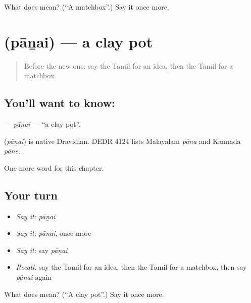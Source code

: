 \begin{tcolorbox}[breakable,colback=teal!4,colframe=teal!35!black,title={Before you move on}]
What does  mean? (\textquotedblleft{}A matchbox\textquotedblright{}.) Say it once more.
\end{tcolorbox}
\section[\texorpdfstring{\ta{பானை} (pāṉai)}{பானை (pāṉai)}]{ (pāṉai) — a clay pot}

\label{lesson:TA-C190-panai}



\begin{quote}
Before the new one: say the Tamil for an idea, then the Tamil for a matchbox.
\end{quote}

\subsection*{You'll want to know: }
\textbf{} — \emph{pāṉai} — \textquotedblleft{}a clay pot\textquotedblright{}.

\begin{cousinweb}
\textbf{} (\emph{pāṉai}) is native Dravidian. DEDR 4124 lists Malayalam \emph{pāna} and Kannada \emph{pāne}.
\end{cousinweb}

\begin{grammarlens}[title={What you've built}]
One more word for this chapter.
\end{grammarlens}

\subsection*{Your turn}
\begin{itemize}
\raggedright
  \item \emph{Say it:} \emph{pāṉai}
  \item \emph{Say it:} \emph{pāṉai}, once more
  \item \emph{Say it:} say \emph{pāṉai}
  \item \emph{Recall:} say the Tamil for an idea, then the Tamil for a matchbox, then say \emph{pāṉai} again
\end{itemize}

\begin{tcolorbox}[breakable,colback=teal!4,colframe=teal!35!black,title={Before you move on}]
What does  mean? (\textquotedblleft{}A clay pot\textquotedblright{}.) Say it once more.
\end{tcolorbox}
